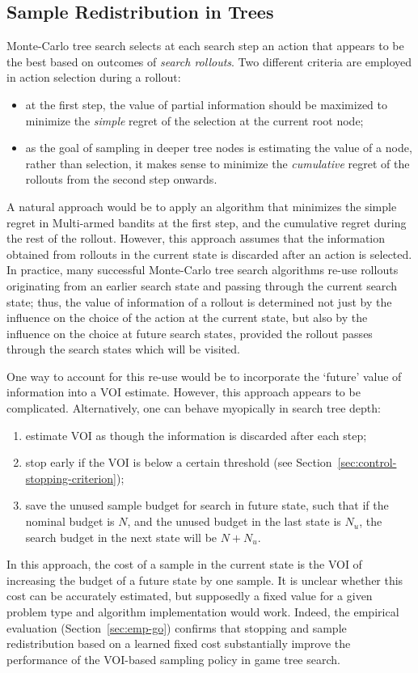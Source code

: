\documentclass[]{article}
\begin{document}
\subsection{Sample Redistribution in Trees}
\label{sec:control-redistribution}

Monte-Carlo tree search \cite{Chaslot.montecarlo} selects at each
search step an action that appears to be the best based on outcomes
of \textit{search rollouts}. Two different criteria are employed in
action selection during a rollout:
\begin{itemize}
\item at the first step, the value of partial
information should be maximized to minimize the \textit{simple} regret
of the selection at the current root node;
\item as the goal of sampling in deeper tree nodes is estimating the
value of a node, rather than selection, it makes sense to minimize
the \textit{cumulative} regret of the rollouts from the second step
onwards.
\end{itemize}

A natural approach would be to apply an algorithm that minimizes the
simple regret in Multi-armed bandits at the first step, and the
cumulative regret during the rest of the rollout.  However, this
approach assumes that the information obtained from rollouts in the
current state is discarded after an action is selected. In practice,
many successful Monte-Carlo tree search algorithms re-use rollouts
originating from an earlier search state and passing through the
current search state; thus, the value of information of a rollout is
determined not just by the influence on the choice of the action at
the current state, but also by the influence on the choice at future
search states, provided the rollout passes through the search states
which will be visited.

One way to account for this re-use would be to incorporate the
`future' value of information into a VOI estimate. However, this 
approach appears to be complicated. Alternatively, one can behave
myopically in search tree depth:
\begin{enumerate}
\item estimate VOI as though the information is discarded after each step;
\item stop early if the VOI is below a certain threshold
   (see Section~\ref{sec:control-stopping-criterion});
\item save the unused sample budget for search in future state, such that
   if the nominal budget is $N$, and the unused budget in the last state
   is $N_u$, the search budget in the next state will be $N+N_u$.
\end{enumerate}
In this approach, the cost of a sample in the current state is the
VOI of increasing the budget of a future state by one sample.  It is
unclear whether this cost can be accurately estimated, but supposedly
a fixed value for a given problem type and algorithm implementation
would work. Indeed, the empirical evaluation (Section~\ref{sec:emp-go})
confirms that stopping and sample redistribution based on a learned
fixed cost  substantially improve the performance of the VOI-based
sampling policy in game tree search.
\end{document}
